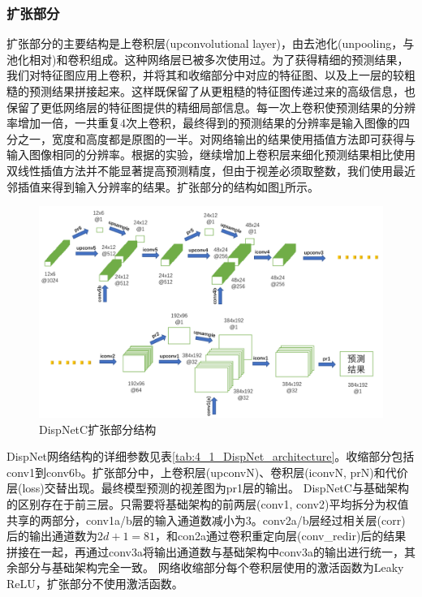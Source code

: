 \subsubsection{扩张部分}
扩张部分的主要结构是上卷积层(upconvolutional layer)，由去池化(unpooling，与池化相对)和卷积组成。这种网络层已被多次使用过\cite{zeiler2011adaptive, zeiler2014visualizing, goodfellow2014generative}。为了获得精细的预测结果，我们对特征图应用上卷积，并将其和收缩部分中对应的特征图、以及上一层的较粗糙的预测结果拼接起来。这样既保留了从更粗糙的特征图传递过来的高级信息，也保留了更低网络层的特征图提供的精细局部信息。每一次上卷积使预测结果的分辨率增加一倍，一共重复4次上卷积，最终得到的预测结果的分辨率是输入图像的四分之一，宽度和高度都是原图的一半。对网络输出的结果使用插值方法即可获得与输入图像相同的分辨率。根据\cite{dosovitskiy2015flownet}的实验，继续增加上卷积层来细化预测结果相比使用双线性插值方法并不能显著提高预测精度，但由于视差必须取整数，我们使用最近邻插值来得到输入分辨率的结果。扩张部分的结构如图\ref{fig:4_1_DispNet_expanding_part}所示。

\begin{figure}[!htbp]
	\centering\includegraphics[width=6in]{figures/4_1_dispnet_expanding_part.png}
	\caption{DispNetC扩张部分结构}\label{fig:4_1_DispNet_expanding_part}
\end{figure}

DispNet网络结构的详细参数见表\ref{tab:4_1_DispNet_architecture}。收缩部分包括conv1到conv6b。扩张部分中，上卷积层(upconvN)、卷积层(iconvN,  prN)和代价层(loss)交替出现。最终模型预测的视差图为pr1层的输出。
DispNetC与基础架构的区别存在于前三层。只需要将基础架构的前两层(conv1, conv2)平均拆分为权值共享的两部分，conv1a/b层的输入通道数减小为3。conv2a/b层经过相关层(corr)后的输出通道数为$2d+1=81$，和con2a通过卷积重定向层(conv\_redir)后的结果拼接在一起，再通过conv3a将输出通道数与基础架构中conv3a的输出进行统一，其余部分与基础架构完全一致。
网络收缩部分每个卷积层使用的激活函数为Leaky ReLU，扩张部分不使用激活函数。

